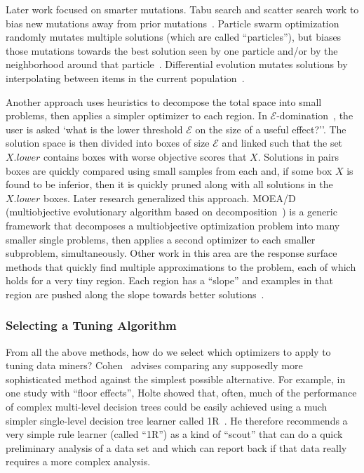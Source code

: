  Later work focused on smarter  
 mutations. Tabu search and scatter search
 work to bias new mutations away from prior
 mutations~\cite{Glover1986563,Beausoleil2006426,Molina05sspmo:a,4455350}.
 Particle swarm
 optimization randomly mutates multiple solutions
 (which are called ``particles''), but biases those
 mutations towards the best solution seen by one
 particle and/or by the neighborhood around that
 particle~\cite{pan08}.
 Differential evolution mutates solutions by
 interpolating between items in the current
 population~\cite{storn1997differential}.  
 
 

 
 
Another approach uses
    heuristics to decompose the total space into   small problems,   then applies a
    simpler optimizer to each region. 
In $\mathcal{E}$-domination~\cite{deb05}, the  user is asked
`what is the lower threshold $\mathcal{E}$ on the size of a useful effect?''. The solution space
is then divided into boxes of size $\mathcal{E}$ and linked such that  the  set $X.\mathit{lower}$ contains boxes with worse objective scores that $X$.  Solutions in pairs boxes are  quickly compared  using   small samples from each  and, if some box $X$ is found to be inferior, then it is quickly pruned along with all
solutions in the $X.\mathit{lower}$ boxes.
Later research generalized this approach. MOEA/D (multiobjective
evolutionary algorithm based on decomposition~\cite{zhang07}) is a generic framework that decomposes a multiobjective optimization problem into many smaller single problems, then applies a second optimizer to each smaller subproblem, simultaneously.   Other work in this area are the response surface methods
that quickly find multiple approximations to the problem, each of which holds for a very tiny region.
Each region has a ``slope'' and examples in that region are pushed along the slope towards better
solutions~\cite{krall15,Zuluaga:13}.
 
 
 \subsubsection{Selecting a Tuning Algorithm}
 
From all the above methods, how do we select which optimizers to apply to tuning data miners?
Cohen~\cite{cohen95} advises comparing any supposedly more
sophisticated method against the simplest possible alternative. For
example, in one study with ``floor effects'', Holte showed that,
often, much of the performance of complex multi-level decision trees
could be easily achieved using a much simpler single-level decision
tree learner called 1R~\cite{holte93}. He therefore recommends a very simple rule learner
(called ``1R'') as a
kind of ``scout'' that can do a quick preliminary analysis of a data
set and which can report back if that data really requires a more
complex analysis.


